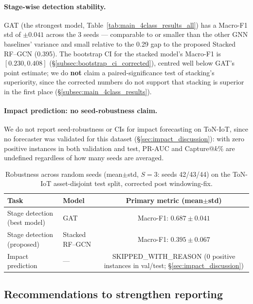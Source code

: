 \documentclass[pdflatex,sn-mathphys-num]{sn-jnl}
\theoremstyle{thmstyleone}%
\theoremstyle{thmstyletwo}%
\theoremstyle{thmstylethree}%
\begin{document}
\paragraph{Stage-wise detection stability.}
GAT (the strongest model, Table~\ref{tab:main_4class_results_all}) has a Macro-F1 std of $\pm0.041$ across the 3 seeds --- comparable to or smaller than the other GNN baselines' variance and small relative to the 0.29 gap to the proposed Stacked RF--GCN (0.395). The bootstrap CI for the stacked model's Macro-F1 is $[0.230, 0.408]$ (\S\ref{subsec:bootstrap_ci_corrected}), centred well below GAT's point estimate; we do \textbf{not} claim a paired-significance test of stacking's superiority, since the corrected numbers do not support that stacking is superior in the first place (\S\ref{subsec:main_4class_results}).

\paragraph{Impact prediction: no seed-robustness claim.}
We do not report seed-robustness or CIs for impact forecasting on ToN-IoT, since no forecaster was validated for this dataset (\S\ref{sec:impact_discussion}): with zero positive instances in both validation and test, PR-AUC and Capture@$k\%$ are undefined regardless of how many seeds are averaged.


\begin{table}[!t]
\centering
\caption{Robustness across random seeds (mean$\pm$std, $S=3$: seeds 42/43/44) on the ToN-IoT asset-disjoint test split, corrected post windowing-fix.}
\label{tab:seed_robustness}
\renewcommand{\arraystretch}{1.12}
\begin{tabular}{llc}
\toprule
\textbf{Task} & \textbf{Model} & \textbf{Primary metric (mean$\pm$std)} \\
\midrule
Stage detection (best model) & GAT & Macro-F1: $0.687\pm0.041$ \\
Stage detection (proposed) & Stacked RF--GCN & Macro-F1: $0.395\pm0.067$ \\
Impact prediction & --- & SKIPPED\_WITH\_REASON (0 positive instances in val/test; \S\ref{sec:impact_discussion}) \\
\bottomrule
\end{tabular}
\end{table}


\subsection{Recommendations to strengthen reporting}
\label{subsec:results_recommendations}
\end{document}
